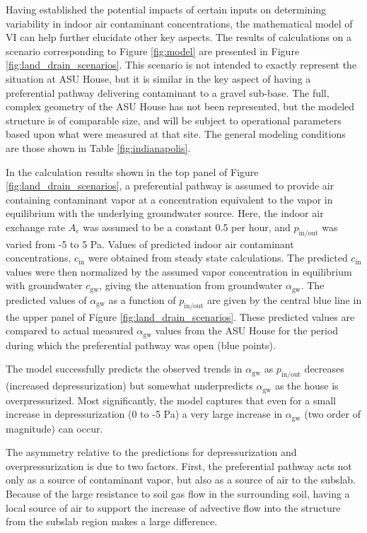 \documentclass[journal=esthag,manuscript=article]{achemso}
\begin{document}
Having established the potential impacts of certain inputs on determining variability in indoor air contaminant concentrations, the mathematical model of VI can help further elucidate other key aspects.
The results of calculations on a scenario corresponding to Figure \ref{fig:model} are presented in Figure \ref{fig:land_drain_scenarios}.
This scenario is not intended to exactly represent the situation at ASU House, but it is similar in the key aspect of having a preferential pathway delivering contaminant to a gravel sub-base.
The full, complex geometry of the ASU House has not been represented, but the modeled structure is of comparable size, and will be subject to operational parameters based upon what were measured at that site.
The general modeling conditions are those shown in Table \ref{fig:indianapolis}.\par

In the calculation results shown in the top panel of Figure \ref{fig:land_drain_scenarios}, a preferential pathway is assumed to provide air containing contaminant vapor at a concentration equivalent to the vapor in equilibrium with the underlying groundwater source.
Here, the indoor air exchange rate $A_e$ was assumed to be a constant 0.5 per hour, and $p_\mathrm{in/out}$ was varied from -5 to 5 Pa.
Values of predicted indoor air contaminant concentrations, $c_\mathrm{in}$ were obtained from steady state calculations.
The predicted $c_\mathrm{in}$ values were then normalized by the assumed vapor concentration in equilibrium with groundwater $c_\mathrm{gw}$, giving the attenuation from groundwater $\alpha_\mathrm{gw}$.
The predicted values of $\alpha_\mathrm{gw}$ as a function of $p_\mathrm{in/out}$ are given by the central blue line in the upper panel of Figure \ref{fig:land_drain_scenarios}.
These predicted values are compared to actual measured $\alpha_\mathrm{gw}$ values from the ASU House for the period during which the preferential pathway was open (blue points).\par

The model successfully predicts the observed trends in $\alpha_\mathrm{gw}$ as $p_\mathrm{in/out}$ decreases (increased depressurization) but somewhat underpredicts $\alpha_\mathrm{gw}$ as the house is overpressurized.
Most significantly, the model captures that even for a small increase in depressurization (0 to -5 Pa) a very large increase in $\alpha_\mathrm{gw}$ (two order of magnitude) can occur.\par

The asymmetry relative to the predictions for depressurization and overpressurization is due to two factors.
First, the preferential pathway acts not only as a source of contaminant vapor, but also  as a source of air to the subslab.
Because of the large resistance to soil gas flow in the surrounding soil, having a local source of air to support the increase of advective flow into the structure from the subslab region makes a large difference.\par
\end{document}
